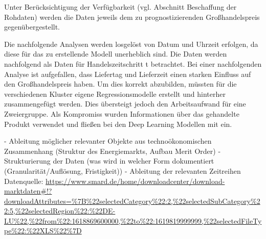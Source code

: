 Unter Berücksichtigung der Verfügbarkeit (vgl. Abschnitt Beschaffung der Rohdaten) werden die Daten jeweils dem zu prognostizierenden Großhandelspreis gegenübergestellt. 

Die nachfolgende Analysen werden losgelöst von Datum und Uhrzeit erfolgen, da diese für das zu erstellende Modell unerheblich sind. Die Daten werden nachfolgend als Daten für Handelszeitschritt t betrachtet. 
Bei einer nachfolgenden Analyse ist aufgefallen, dass Liefertag und Lieferzeit einen starken Einfluss auf den Großhandelspreis haben. Um dies korrekt abzubilden, müssten für die verschiedenen Kluster eigene Regressionsmodelle erstellt und hinterher zusammengefügt werden. Dies übersteigt jedoch den Arbeitsaufwand für eine Zweiergruppe. Als Kompromiss wurden Informationen über das gehandelte Produkt verwendet und fließen bei den Deep Learning Modellen mit ein.




-	Ableitung möglicher relevanter Objekte aus technoökonomischen Zusammenhang (Struktur des Energiemarkts, Aufbau Merit Order)
-	Strukturierung der Daten (was wird in welcher Form dokumentiert (Granularität/Auflösung, Fristigkeit))
-	Ableitung der relevanten Zeitreihen
Datenquelle: \url{https://www.smard.de/home/downloadcenter/download-marktdaten#!?downloadAttributes=%7B%22selectedCategory%22:2,%22selectedSubCategory%22:5,%22selectedRegion%22:%22DE-LU%22,%22from%22:1618869600000,%22to%22:1619819999999,%22selectedFileType%22:%22XLS%22%7D}